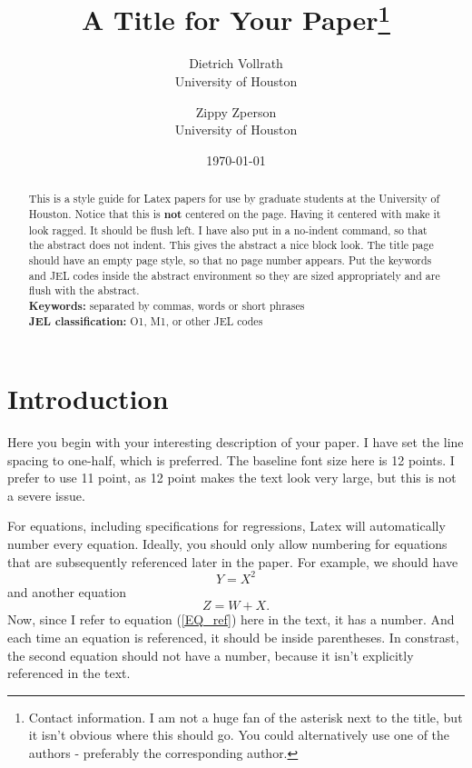 \documentclass[11pt]{article}
\title{A Title for Your Paper\thanks{Contact information. I am not a huge fan of the asterisk next to the title, but it isn't obvious where this should go. You could alternatively use one of the authors - preferably the corresponding author.}}
\author{ %
    Dietrich Vollrath \\ 
    University of Houston
    \and
    Zippy Zperson \\
    University of Houston
}
\date{\today}
\begin{document}
\maketitle
\thispagestyle{empty}

\begin{abstract} %
\noindent This is a style guide for Latex papers for use by graduate students at the University of Houston. Notice that this is \textbf{not} centered on the page. Having it centered with make it look ragged. It should be flush left. I have also put in a no-indent command, so that the abstract does not indent. This gives the abstract a nice block look. The title page should have an empty page style, so that no page number appears. Put the keywords and JEL codes inside the abstract environment so they are sized appropriately and are flush with the abstract.\\

\noindent \textbf{Keywords:} separated by commas, words or short phrases \\

\noindent \textbf{JEL classification:} O1, M1, or other JEL codes
\end{abstract}

\newpage %
\setcounter{page}{1} %

\section{Introduction}
\onehalfspacing Here you begin with your interesting description of your paper. I have set the line spacing to one-half, which is preferred. The baseline font size here is 12 points. I prefer to use 11 point, as 12 point makes the text look very large, but this is not a severe issue.

For equations, including specifications for regressions, Latex will automatically number every equation. Ideally, you should only allow numbering for equations that are subsequently referenced later in the paper. For example, we should have
\begin{equation}
    Y = X^2 \label{EQ_ref}
\end{equation}
and another equation
\begin{equation}
    Z = W + X. \nonumber
\end{equation}
Now, since I refer to equation (\ref{EQ_ref}) here in the text, it has a number. And each time an equation is referenced, it should be inside parentheses. In constrast, the second equation should not have a number, because it isn't explicitly referenced in the text.
\end{document}
